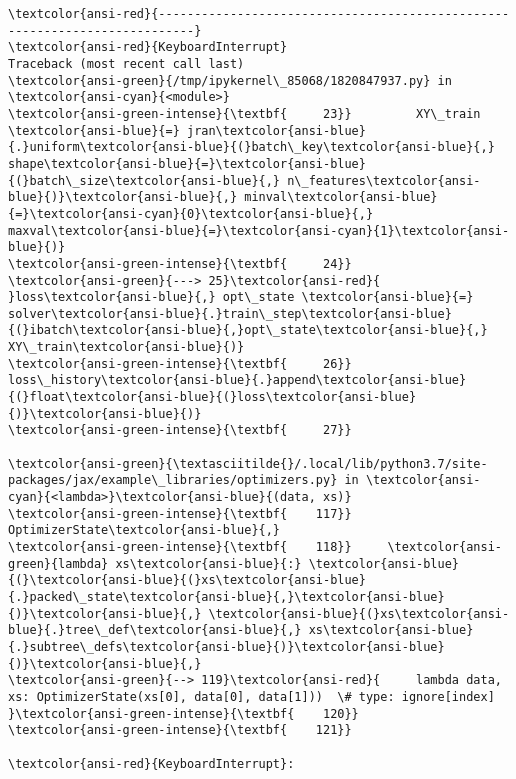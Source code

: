 \documentclass[11pt]{article}
\begin{document}
    \begin{Verbatim}[commandchars=\\\{\}, frame=single, framerule=2mm, rulecolor=\color{outerrorbackground}]
\textcolor{ansi-red}{---------------------------------------------------------------------------}
\textcolor{ansi-red}{KeyboardInterrupt}                         Traceback (most recent call last)
\textcolor{ansi-green}{/tmp/ipykernel\_85068/1820847937.py} in \textcolor{ansi-cyan}{<module>}
\textcolor{ansi-green-intense}{\textbf{     23}}         XY\_train \textcolor{ansi-blue}{=} jran\textcolor{ansi-blue}{.}uniform\textcolor{ansi-blue}{(}batch\_key\textcolor{ansi-blue}{,} shape\textcolor{ansi-blue}{=}\textcolor{ansi-blue}{(}batch\_size\textcolor{ansi-blue}{,} n\_features\textcolor{ansi-blue}{)}\textcolor{ansi-blue}{,} minval\textcolor{ansi-blue}{=}\textcolor{ansi-cyan}{0}\textcolor{ansi-blue}{,} maxval\textcolor{ansi-blue}{=}\textcolor{ansi-cyan}{1}\textcolor{ansi-blue}{)}
\textcolor{ansi-green-intense}{\textbf{     24}} 
\textcolor{ansi-green}{---> 25}\textcolor{ansi-red}{         }loss\textcolor{ansi-blue}{,} opt\_state \textcolor{ansi-blue}{=} solver\textcolor{ansi-blue}{.}train\_step\textcolor{ansi-blue}{(}ibatch\textcolor{ansi-blue}{,}opt\_state\textcolor{ansi-blue}{,} XY\_train\textcolor{ansi-blue}{)}
\textcolor{ansi-green-intense}{\textbf{     26}}         loss\_history\textcolor{ansi-blue}{.}append\textcolor{ansi-blue}{(}float\textcolor{ansi-blue}{(}loss\textcolor{ansi-blue}{)}\textcolor{ansi-blue}{)}
\textcolor{ansi-green-intense}{\textbf{     27}} 

\textcolor{ansi-green}{\textasciitilde{}/.local/lib/python3.7/site-packages/jax/example\_libraries/optimizers.py} in \textcolor{ansi-cyan}{<lambda>}\textcolor{ansi-blue}{(data, xs)}
\textcolor{ansi-green-intense}{\textbf{    117}}     OptimizerState\textcolor{ansi-blue}{,}
\textcolor{ansi-green-intense}{\textbf{    118}}     \textcolor{ansi-green}{lambda} xs\textcolor{ansi-blue}{:} \textcolor{ansi-blue}{(}\textcolor{ansi-blue}{(}xs\textcolor{ansi-blue}{.}packed\_state\textcolor{ansi-blue}{,}\textcolor{ansi-blue}{)}\textcolor{ansi-blue}{,} \textcolor{ansi-blue}{(}xs\textcolor{ansi-blue}{.}tree\_def\textcolor{ansi-blue}{,} xs\textcolor{ansi-blue}{.}subtree\_defs\textcolor{ansi-blue}{)}\textcolor{ansi-blue}{)}\textcolor{ansi-blue}{,}
\textcolor{ansi-green}{--> 119}\textcolor{ansi-red}{     lambda data, xs: OptimizerState(xs[0], data[0], data[1]))  \# type: ignore[index]
}\textcolor{ansi-green-intense}{\textbf{    120}} 
\textcolor{ansi-green-intense}{\textbf{    121}} 

\textcolor{ansi-red}{KeyboardInterrupt}: 
    \end{Verbatim}
\end{document}
